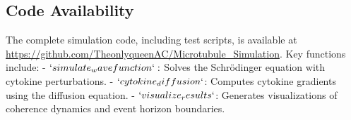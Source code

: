 \subsection{Code Availability}

The complete simulation code, including test scripts, is available at \url{https://github.com/TheonlyqueenAC/Microtubule_Simulation}. Key functions include:
- $`simulate_wavefunction`:$ Solves the Schr\"odinger equation with cytokine perturbations.
- $`cytokine_diffusion`$: Computes cytokine gradients using the diffusion equation.
- $`visualize_results`$: Generates visualizations of coherence dynamics and event horizon boundaries.

